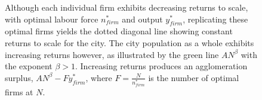 \begin{figure}[h!tb]
    \centering

    \caption[Increasing returns to scale for cities and decreasing returns for firms]{ Although each individual firm exhibits decreasing returns to scale, with optimal labour force $n_{firm}^*$ and output $y_{firm}^*$, replicating these optimal firms yields the dotted diagonal line showing constant returns to scale for the city. The city population as a whole exhibits increasing returns however, as illustrated by the green line $AN^\beta$ with  the exponent $\beta>1$. Increasing returns produces an agglomeration surplus, $AN^\beta-Fy_{firm}^*$, where $F=\frac{N}{n_{firm}^*}$ is the number of optimal firms at $N$.}
    \label{fig-agglomeration-surplus} %
\end{figure}
 

